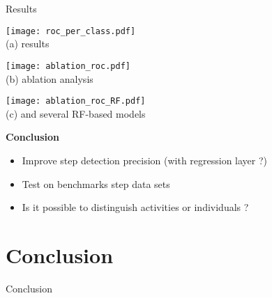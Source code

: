 \begin{frame}{Results}{}
\renewcommand{\ratiob}{0.98}
    \begin{minipage}{\linewidth}
        \centering
        \begin{minipage}[t]{0.33\linewidth}
            \centering
            \texttt{[image: roc\_per\_class.pdf]}\\
            {\small(a)\; \algo results}
        \end{minipage}\hfill
        \begin{minipage}[t]{0.33\linewidth}
            \centering
            \texttt{[image: ablation\_roc.pdf]}\\
            {\small(b)\; \algo ablation analysis}
        \end{minipage}\hfill
        \begin{minipage}[t]{0.33\linewidth}
            \centering
            \texttt{[image: ablation\_roc\_RF.pdf]}\\
            {\small(c)\; \algo and several RF-based models}
        \end{minipage}
    \end{minipage}

\centering\textbf{Conclusion}
\begin{itemize}
    \item Improve step detection precision (with regression layer ?)
    \item Test on benchmarks step data sets
    \item Is it possible to distinguish activities or individuals ?
\end{itemize}

\end{frame}

\subsection{}


\section{Conclusion}



\begingroup
{}  %
\begin{frame}[noframenumbering]{}
    \centering
    \vspace{3cm}
    \Huge
    \textcolor{myblue}{Conclusion}
\end{frame}
\endgroup

